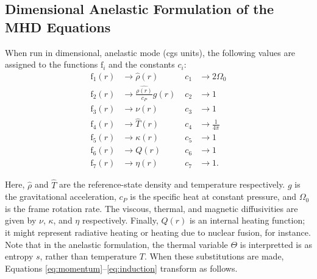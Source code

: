 \documentclass[10pt, letterpaper]{article}
\newcommand{\ff}{\mathrm{f}}
\begin{document}
\subsection{Dimensional Anelastic Formulation of the MHD Equations}
When run in dimensional, anelastic mode (cgs units), the following values are assigned to the functions $\ff_i$ and the constants $c_i$:
\begin{align*}
\ff_1(r) &\rightarrow \hat{\rho}(r)\; &c_1 &\rightarrow 2\Omega_0 \\
\ff_2(r) &\rightarrow \frac{\hat{\rho(r)}}{c_P}g(r)\; &c_2 &\rightarrow 1 \\
\ff_3(r) &\rightarrow \nu(r)\; &c_3 &\rightarrow 1\\
\ff_4(r) &\rightarrow \hat{T}(r)\; &c_4 &\rightarrow \frac{1}{4\pi} \\
\ff_5(r) &\rightarrow \kappa(r)\; &c_5 &\rightarrow 1 \\
\ff_6(r) &\rightarrow Q(r)\; &c_6 &\rightarrow 1  \\
\ff_7(r) &\rightarrow \eta(r)\; &c_7 &\rightarrow 1.
\end{align*}

Here, $\hat{\rho}$ and $\hat{T}$ are the reference-state density and temperature respectively.   $g$ is the gravitational acceleration, $c_P$ is the specific heat at constant pressure, and $\Omega_0$ is the frame rotation rate.   The viscous, thermal, and magnetic diffusivities are given by $\nu$, $\kappa$, and $\eta$ respectively.  Finally, $Q(r)$ is an internal heating function; it might represent radiative heating or heating due to nuclear fusion, for instance.  Note that in the anelastic formulation, the thermal variable $\Theta$ is interpretted is as entropy $s$, rather than temperature $T$.   When these substitutions are made, Equations \ref{eq:momentum}--\ref{eq:induction} transform as follows.
\end{document}
